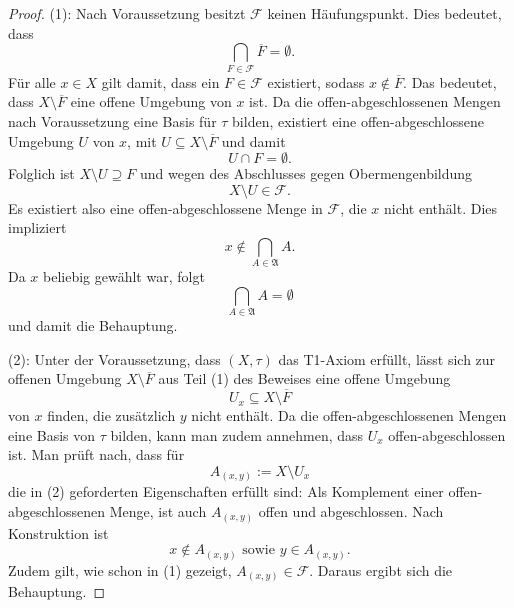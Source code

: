 \begin{proof}
  (1):
  Nach Voraussetzung besitzt $\mathcal{F}$ keinen Häufungspunkt.
  Dies bedeutet, dass
  \begin{displaymath}
    \bigcap_{F \in \mathcal{F}} \overline F = \emptyset.
  \end{displaymath}
  Für alle $x \in X$ gilt damit, dass ein $F \in \mathcal{F}$ existiert, sodass $x \not\in \overline{F}$.
  Das bedeutet, dass $X \setminus \overline{F}$ eine offene Umgebung von $x$ ist.
  Da die offen-abgeschlossenen Mengen nach Voraussetzung eine Basis für $\tau$ bilden, existiert eine offen-abgeschlossene Umgebung $U$ von $x$, mit $U \subseteq X \setminus \overline{F}$ und damit
  \begin{displaymath}
    U \cap F = \emptyset.
  \end{displaymath}
  Folglich ist $X \setminus U \supseteq F$ und wegen des Abschlusses gegen Obermengenbildung
  \begin{displaymath}
    X \setminus U \in \mathcal{F}.
  \end{displaymath}
  Es existiert also eine offen-abgeschlossene Menge in $\mathcal{F}$, die $x$ nicht enthält. 
  Dies impliziert
  \begin{displaymath}
    x \not\in \bigcap_{A \in \mathfrak{A}} A.
  \end{displaymath}
  Da $x$ beliebig gewählt war, folgt 
  \begin{displaymath}
   \bigcap_{A \in \mathfrak{A}} A = \emptyset
  \end{displaymath}
  und damit die Behauptung.

  (2):
  Unter der Voraussetzung, dass $(X,\tau)$ das T1-Axiom erfüllt, lässt sich zur offenen Umgebung $X \setminus \overline{F}$ aus Teil (1) des Beweises eine offene Umgebung 
  \begin{displaymath}
    U_x \subseteq X \setminus \overline{F}
  \end{displaymath}
  von $x$ finden, die zusätzlich $y$ nicht enthält. 
  Da die offen-abgeschlossenen Mengen eine Basis von $\tau$ bilden, kann man zudem annehmen, dass $U_x$ offen-abgeschlossen ist.
  Man prüft nach, dass für
  \begin{displaymath}
    A_{(x,y)} := X \setminus U_x
  \end{displaymath}
  die in (2) geforderten Eigenschaften erfüllt sind:
  Als Komplement einer offen-abgeschlossenen Menge, ist auch $A_{(x,y)}$ offen und abgeschlossen.
  Nach Konstruktion ist 
  \begin{displaymath}
    x \not\in A_{(x,y)} \text{ sowie } y \in A_{(x,y)}.
  \end{displaymath}
  Zudem gilt, wie schon in (1) gezeigt, $A_{(x,y)} \in \mathcal{F}$.
  Daraus ergibt sich die Behauptung. \qedhere
\end{proof}

